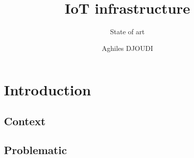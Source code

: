 \documentclass[8pt]{beamer}
\begin{document}
\title{IoT infrastructure}
\subtitle{State of art}
\author{Aghiles DJOUDI}

\firstpage

\section{Introduction}
	\subsection*{Context}
		
	\subsection*{Problematic}
		
%		
%		
%		

\tableofcontent

%		
%		
\end{document}
